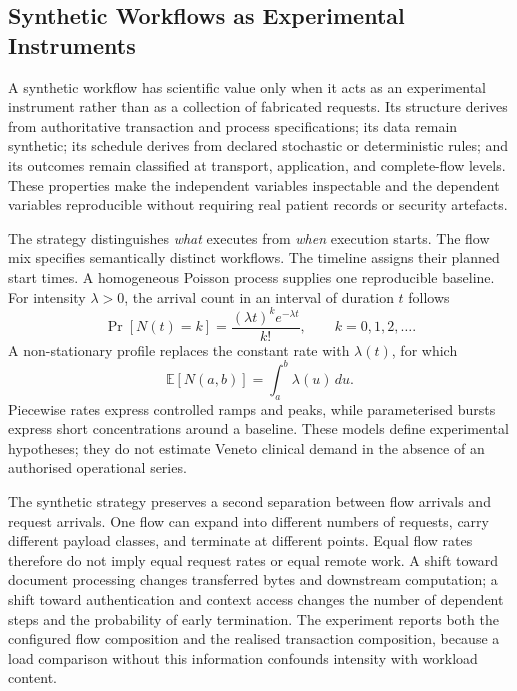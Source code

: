 \subsection{Synthetic Workflows as Experimental Instruments}
\label{sub:experimental}
\noindent A synthetic workflow has scientific value only when it acts as an
experimental instrument rather than as a collection of fabricated requests. Its
structure derives from authoritative transaction and process specifications; its
data remain synthetic; its schedule derives from declared stochastic or
deterministic rules; and its outcomes remain classified at transport,
application, and complete-flow levels. These properties make the independent
variables inspectable and the dependent variables reproducible without requiring
real patient records or security artefacts.

\noindent The strategy distinguishes \emph{what} executes from \emph{when} execution
starts. The flow mix specifies semantically distinct workflows. The timeline
assigns their planned start times. A homogeneous Poisson process supplies one
reproducible baseline. For intensity $\lambda>0$, the arrival count in an interval
of duration $t$ follows
\begin{equation}
    \Pr[N(t)=k]=\frac{(\lambda t)^k e^{-\lambda t}}{k!},
    \qquad k=0,1,2,\ldots .
\end{equation}
A non-stationary profile replaces the constant rate with $\lambda(t)$, for which
\begin{equation}
    \mathbb{E}[N(a,b)]=\int_a^b \lambda(u)\,du .
\end{equation}
\noindent Piecewise rates express controlled ramps and peaks, while parameterised bursts
express short concentrations around a baseline. These models define experimental
hypotheses; they do not estimate Veneto clinical demand in the absence of an
authorised operational series.

\noindent The synthetic strategy preserves a second separation between flow arrivals and
request arrivals. One flow can expand into different numbers of requests, carry
different payload classes, and terminate at different points. Equal flow rates
therefore do not imply equal request rates or equal remote work. A shift toward
document processing changes transferred bytes and downstream computation; a
shift toward authentication and context access changes the number of dependent
steps and the probability of early termination. The experiment reports both the
configured flow composition and the realised transaction composition, because a
load comparison without this information confounds intensity with workload
content.

